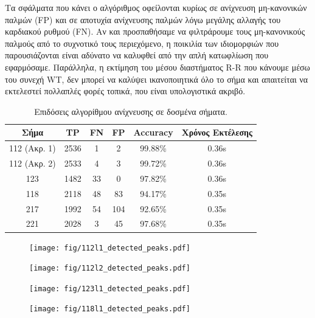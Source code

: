 \documentclass[11pt,a4paper]{article}
\begin{document}
Τα σφάλματα που κάνει ο αλγόριθμος οφείλονται κυρίως σε ανίχνευση μη-κανονικών παλμών (FP) και σε αποτυχία ανίχνευσης παλμών λόγω μεγάλης αλλαγής του καρδιακού ρυθμού (FN). Αν και προσπαθήσαμε να φιλτράρουμε τους μη-κανονικούς παλμούς από το συχνοτικό τους περιεχόμενο, η ποικιλία των ιδιομορφιών που παρουσιάζονται είναι αδύνατο να καλυφθεί από την απλή κατωφλίωση που εφαρμόσαμε. Παράλληλα, η εκτίμηση του μέσου διαστήματος R-R που κάνουμε μέσω του συνεχή WT, δεν μπορεί να καλύψει ικανοποιητικά όλο το σήμα και απαιτείται να εκτελεστεί πολλαπλές φορές τοπικά, που είναι υπολογιστικά ακριβό.



\begin{table}[H]
\begin{center}
\begin{tabular}{| c | c | c | c | c | c |}
 \hline
 Σήμα & TP & FN & FP & Accuracy & Χρόνος Εκτέλεσης \\ 
 \hline
 112 (Ακρ. 1) & 2536 & 1 & 2 & 99.88\% & 0.36s \\ 
 \hline
 112 (Ακρ. 2) & 2533 & 4 & 3 & 99.72\% & 0.36s \\ 
 \hline
 123 & 1482 & 33 & 0 & 97.82\% & 0.36s \\ 
 \hline
 118 & 2118 & 48 & 83 & 94.17\% & 0.35s \\ 
 \hline
 217 & 1992 & 54 & 104 & 92.65\% & 0.35s \\ 
 \hline
 221 & 2028 & 3 & 45 & 97.68\% & 0.35s \\ 
 \hline
\end{tabular}
\end{center}

\caption{Επιδόσεις αλγορίθμου ανίχνευσης σε δοσμένα σήματα.}
\label{tab:accuracy}
\end{table}


\begin{figure}[H]
\centering
\begin{minipage}{0.48\textwidth}
	\centering
	\texttt{[image: fig/112l1\_detected\_peaks.pdf]}
\end{minipage}
\begin{minipage}{0.48\textwidth}
	\centering
	\texttt{[image: fig/112l2\_detected\_peaks.pdf]}
\end{minipage}
\end{figure}

\begin{figure}[H]
\centering
\begin{minipage}{0.48\textwidth}
	\centering
	\texttt{[image: fig/123l1\_detected\_peaks.pdf]}
\end{minipage}
\begin{minipage}{0.48\textwidth}
	\centering
	\texttt{[image: fig/118l1\_detected\_peaks.pdf]}
\end{minipage}
\end{figure}
\end{document}
